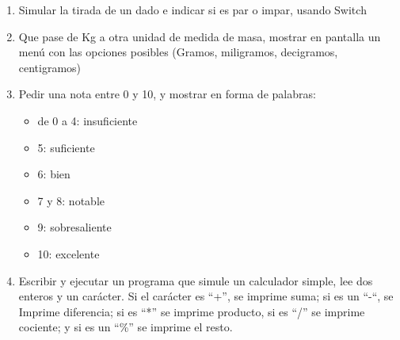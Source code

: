 \begin{enumerate}[resume]
	   
	\item Simular la tirada de un dado e indicar si es par o impar, usando Switch
	   
	\item Que pase de Kg a otra unidad de medida de masa, mostrar en pantalla un menú con las opciones posibles (Gramos, miligramos, decigramos, centigramos)
	   
	\item Pedir una nota entre 0 y 10, y mostrar en forma de palabras:
		\begin{itemize}
	       \item de 0 a 4: insuficiente
	  	   \item 5: suficiente
	  	   \item 6: bien
	       \item 7 y 8: notable
	       \item 9: sobresaliente
	       \item 10: excelente
	   \end{itemize}
	   
	\item Escribir y ejecutar un programa que simule un calculador simple, lee dos enteros y un carácter. Si el carácter es “+”, se imprime suma; si es un “-“, se Imprime diferencia; si es “*” se imprime producto, si es “/” se imprime cociente; y si es un “\%” se imprime el resto.
	  
	  
	  
	  
	  
	  
	  
	  
\end{enumerate}
